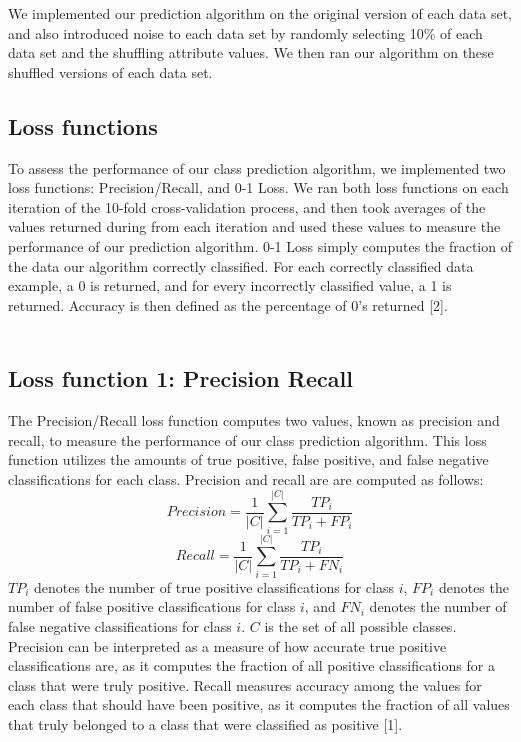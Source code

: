 \documentclass[twoside,11pt]{article}
\begin{document}
We implemented our prediction algorithm on the original version of each data set, and also introduced noise to each data set by randomly selecting 10\% of each data set and the shuffling attribute values. We then ran our algorithm on these shuffled versions of each data set.

\subsection{Loss functions}
To assess the performance of our class prediction algorithm, we implemented two loss functions: Precision/Recall, and 0-1 Loss. We ran both loss functions on each iteration of the 10-fold cross-validation process, and then took averages of the values returned during from each iteration and used these values to measure the performance of our prediction algorithm. 0-1 Loss simply computes the fraction of the data our algorithm correctly classified. For each correctly classified data example, a 0 is returned, and for every incorrectly classified value, a 1 is returned. Accuracy is then defined as the percentage of 0's returned [2].\\ \\

\subsection{Loss function 1: Precision Recall}
The Precision/Recall loss function computes two values, known as precision and recall, to measure the performance of our class prediction algorithm. This loss function utilizes the amounts of true positive, false positive, and false negative classifications for each class. Precision and recall are are computed as follows: 
$$Precision = \frac{1}{|C|} \sum^{|C|}_{i=1} \frac{TP_i}{TP_i + FP_i}$$
$$Recall = \frac{1}{|C|} \sum^{|C|}_{i=1} \frac{TP_i}{TP_i + FN_i}$$
$TP_i$ denotes the number of true positive classifications for class $i$, $FP_i$ denotes the number of false positive classifications for class $i$, and $FN_i$ denotes the number of false negative classifications for class $i$. $C$ is the set of all possible classes. Precision can be interpreted as a measure of how accurate true positive classifications are, as it computes the fraction of all positive classifications for a class that were truly positive. Recall measures accuracy among the values for each class that should have been positive, as it computes the fraction of all values that truly belonged to a class that were classified as positive [1]. \\ \\
\end{document}
